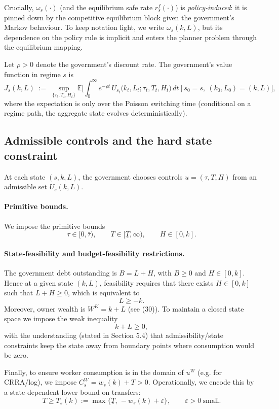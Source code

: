 \documentclass{article}
\begin{document}
Crucially, $\omega_s(\cdot)$ (and the equilibrium safe rate $r^f_s(\cdot)$) is \emph{policy-induced}:
it is pinned down by the competitive equilibrium block given the government's Markov behaviour.
To keep notation light, we write $\omega_s(k,L)$, but its dependence on the policy rule is implicit
and enters the planner problem through the equilibrium mapping.

Let $\rho>0$ denote the government's discount rate. The government's value function in regime $s$ is
\begin{equation}
J_s(k,L)
\;:=\;
\sup_{\{\tau_t,T_t,H_t\}}
\mathbb E\Bigg[\int_0^\infty e^{-\rho t}\,
U_{s_t}\big(k_t,L_t;\tau_t,T_t,H_t\big)\,dt
\ \Big|\ s_0=s,\ (k_0,L_0)=(k,L)\Bigg],
\label{eq:MP_planner_value_def_revised}
\end{equation}
where the expectation is only over the Poisson switching time (conditional on a regime path,
the aggregate state evolves deterministically).

\subsection{Admissible controls and the hard state constraint}

At each state $(s,k,L)$, the government chooses controls $u=(\tau,T,H)$ from an admissible set $U_s(k,L)$.

\paragraph{Primitive bounds.}
We impose the primitive bounds
\[
\tau\in[0,\bar\tau),\qquad T\in[\underline T,\infty),\qquad H\in[0,k].
\]

\paragraph{State-feasibility and budget-feasibility restrictions.}
The government debt outstanding is $B=L+H$, with $B\ge 0$ and $H\in[0,k]$. Hence at a given state $(k,L)$, feasibility
requires that there exists $H\in[0,k]$ such that $L+H\ge 0$, which is equivalent to
\[
L\ge -k.
\tag{44}
\]
Moreover, owner wealth is $W^K=k+L$ (see (30)). To maintain a closed state space we impose the weak inequality
\[
k+L\ge 0,
\tag{45}
\]
with the understanding (stated in Section 5.4) that admissibility/state constraints keep the state away from boundary
points where consumption would be zero.

Finally, to ensure worker consumption is in the domain of $u^W$ (e.g. for CRRA/log), we impose $C^W_s=w_s(k)+T>0$.
Operationally, we encode this by a state-dependent lower bound on transfers:
\[
T\ge T_s(k):=\max\{\underline T,\,-w_s(k)+\varepsilon\},\qquad \varepsilon>0\ \text{small}.
\tag{46}
\]
\end{document}
